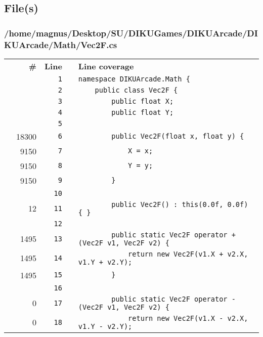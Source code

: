 \documentclass[a4paper,landscape,10pt]{article}
\begin{document}
\subsection{File(s)}
\subsubsection{/home/magnus/Desktop/SU/DIKUGames/DIKUArcade/DIKUArcade/Math/Vec2F.cs}
\begin{longtable}[l]{lrrll}
\textbf{} & \textbf{\#} & \textbf{Line} & \textbf{} & \textbf{Line coverage}\\
\cellcolor{gray} &  & \verb~1~ & & \verb~namespace DIKUArcade.Math {~\\
\cellcolor{gray} &  & \verb~2~ & & \verb~    public class Vec2F {~\\
\cellcolor{gray} &  & \verb~3~ & & \verb~        public float X;~\\
\cellcolor{gray} &  & \verb~4~ & & \verb~        public float Y;~\\
\cellcolor{gray} &  & \verb~5~ & & \verb~~\\
\cellcolor{green} & 18300 & \verb~6~ & & \verb~        public Vec2F(float x, float y) {~\\
\cellcolor{green} & 9150 & \verb~7~ & & \verb~            X = x;~\\
\cellcolor{green} & 9150 & \verb~8~ & & \verb~            Y = y;~\\
\cellcolor{green} & 9150 & \verb~9~ & & \verb~        }~\\
\cellcolor{gray} &  & \verb~10~ & & \verb~~\\
\cellcolor{green} & 12 & \verb~11~ & & \verb~        public Vec2F() : this(0.0f, 0.0f) { }~\\
\cellcolor{gray} &  & \verb~12~ & & \verb~~\\
\cellcolor{green} & 1495 & \verb~13~ & & \verb~        public static Vec2F operator +(Vec2F v1, Vec2F v2) {~\\
\cellcolor{green} & 1495 & \verb~14~ & & \verb~            return new Vec2F(v1.X + v2.X, v1.Y + v2.Y);~\\
\cellcolor{green} & 1495 & \verb~15~ & & \verb~        }~\\
\cellcolor{gray} &  & \verb~16~ & & \verb~~\\
\cellcolor{red} & 0 & \verb~17~ & & \verb~        public static Vec2F operator -(Vec2F v1, Vec2F v2) {~\\
\cellcolor{red} & 0 & \verb~18~ & & \verb~            return new Vec2F(v1.X - v2.X, v1.Y - v2.Y);~\\

\end{longtable}
\end{document}
